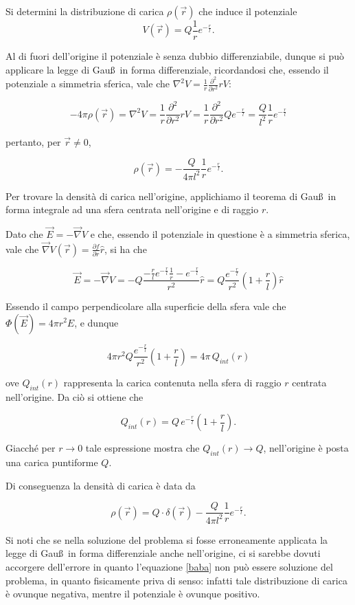 \documentclass[../main.tex]{subfiles}
\begin{document}

\textex

Si determini la distribuzione di carica $\rho(\vec{r})$ che induce il potenziale
\begin{displaymath}
V(\vec{r})=Q\frac{1}{r}e^{-\frac{r}{l}}.
\end{displaymath}


\solution

 Al di fuori dell'origine il potenziale è senza dubbio differenziabile, dunque si può applicare la legge di Gau\ss\ in forma
 differenziale, ricordandosi che, essendo il potenziale a simmetria sferica, vale che
 $\nabla^2V=\frac{1}{r}\frac{\partial^2}{\partial r^2}rV$:
 
 $$-4\pi\rho(\vec{r})=\nabla^2V=\frac{1}{r}\frac{\partial^2}{\partial r^2}rV=
 \frac{1}{r}\frac{\partial^2 }{\partial r^2}Qe^{-\frac{r}{l} }=\frac{Q}{l^2}\frac{1}{r}e^{- \frac{r}{l}}$$
 
 pertanto, per $\vec{r}\ne 0$,
 
  \begin{equation}\label{baba}
  \rho(\vec{r})=-\frac{Q}{4\pi l^2}\frac{1}{r}e^{- \frac{r}{l}}.
  \end{equation}
 
 Per trovare la densità di carica nell'origine, applichiamo il teorema di Gau\ss\ in forma integrale ad una sfera centrata
 nell'origine e di raggio $r$.

 Dato che $\vec{E}=-\vec{\nabla}V$ e che, essendo il potenziale in questione è a simmetria sferica, vale che
 $\vec{\nabla}V(\vec{r})=\frac{\partial f}{\partial r}\hat{r}$, si ha che

  $$\vec{E}=-\vec{\nabla}V=-Q \frac{-\frac{r}{l}e^{-\frac{r}{l}}\frac{1}{r}-e^{-\frac{r}{l}}}{r^2}\hat{r}=
  Q\frac{e^{-\frac{r}{l}}}{r^2}\left(1+\frac{r}{l}\right)\hat{r}$$
  
 Essendo il campo perpendicolare alla superficie della sfera vale che $\Phi(\vec{E})=4\pi r^2 E$, e dunque
 
  $$4\pi r^2Q\frac{e^{-\frac{r}{l}}}{r^2}\left(1+\frac{r}{l}\right)=4\pi\, Q_{int}(r)$$
 
 ove $Q_{int}(r)$ rappresenta la carica contenuta nella sfera di raggio $r$ centrata nell'origine. Da ciò si ottiene che
 
 $$Q_{int}(r)=Q\, e^{-\frac{r}{l}}\left(1+\frac{r}{l}\right).$$
 
 Giacché per $r\to 0$ tale espressione mostra che $Q_{int}(r)\to Q$, nell'origine è posta una carica puntiforme $Q$.
 
 Di conseguenza la densità di carica è data da
 
 $$\rho(\vec{r})=Q\cdot\delta(\vec{r})-\frac{Q}{4\pi l^2}\frac{1}{r}e^{- \frac{r}{l}}.$$
 
 Si noti che se nella soluzione del problema si fosse erroneamente applicata la legge di Gau\ss\ in forma differenziale anche
 nell'origine, ci si sarebbe dovuti accorgere dell'errore in quanto l'equazione \ref{baba} non può essere soluzione del
 problema, in quanto fisicamente priva di senso: infatti tale distribuzione di carica è ovunque negativa, mentre il potenziale
 è ovunque positivo.
\end{document}
